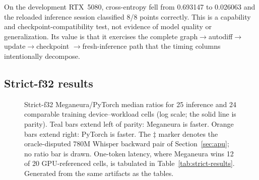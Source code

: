 \documentclass[10pt,twocolumn]{article}
\newcommand{\system}{Meganeura}
\begin{document}
On the development RTX~5080, cross-entropy fell from 0.693147 to 0.026063 and
the reloaded inference session classified 8/8 points correctly. This is a
capability and checkpoint-compatibility test, not evidence of model quality or
generalization. Its value is that it exercises the complete
graph$\rightarrow$autodiff$\rightarrow$update$\rightarrow$checkpoint
$\rightarrow$fresh-inference path that the timing columns intentionally
decompose.



\subsection{Strict-f32 results}
\label{sec:strict-results}

\begin{table}[!t]
\centering
\scriptsize
\setlength{\tabcolsep}{3.6pt}

\caption{Strict-f32 results: medians over 20 samples after 5 warmups.
$\times$ is the \system{}/PyTorch ratio; bold marks cells where \system{} is
faster. F+L+B is forward, scalar loss, and backward without an optimizer
update. Every cell passes the forward gate of Section~\ref{sec:method}, and
every F+L+B cell except the marked pair passes the backward comparison.
$\ddagger$: oracle-disputed --- Section~\ref{sec:apu} shows that the
PyTorch/ROCm 780M result is inconsistent with the other reference backends.
The two raw times are retained, but their ratio and both aggregate
contributions are omitted. Whisper's
minimal shape equals its full shape, so its two forward columns coincide.
The Intel rows compare the integrated GPU against PyTorch's CPU fallback
and are reported as a support result, not an engine-efficiency result.}
\label{tab:strict-results}
\end{table}

\begin{figure}[!t]
\centering
\resizebox{0.98\textwidth}{!}{}
\caption{Strict-f32 \system{}/PyTorch median ratios for 25 inference and 24
comparable training device--workload cells (log scale; the solid line is parity). Teal bars
extend left of parity: \system{} is faster. Orange bars extend right:
PyTorch is faster. The $\ddagger$ marker denotes the oracle-disputed 780M
Whisper backward pair of Section~\ref{sec:apu}; no ratio bar is drawn.
One-token latency, where \system{}
wins 12 of 20 GPU-referenced cells, is tabulated in
Table~\ref{tab:strict-results}. Generated from the same artifacts as the
tables.}
\label{fig:ratios}
\end{figure}
\end{document}
